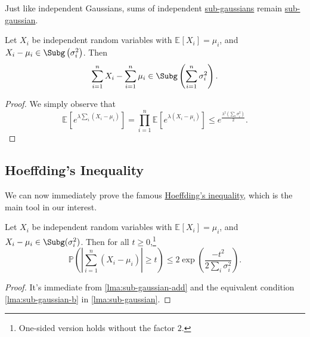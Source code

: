 Just like independent Gaussians, sums of independent \hyperref[def:sub-gaussian]{sub-gaussians} remain \hyperref[def:sub-gaussian]{sub-gaussian}.

\begin{lemma}\label{lma:sub-gaussian-add}
  Let \(X_i\) be independent random variables with \(\mathbb{E}_{}\left[X_i \right] = \mu _i\), and \(X_i - \mu _i \in \Subg\left( \sigma _i^2 \right)  \). Then
  \[
    \sum_{i=1}^n X_i - \sum_{i=1}^n \mu _i \in \Subg\left( \sum_{i=1}^n \sigma _i^2 \right) .
  \]
\end{lemma}
\begin{proof}
  We simply observe that
  \[
    \mathbb{E}_{}\left[e^{\lambda \sum_{i} (X_i - \mu _i)} \right]
    = \prod _{i=1}^n \mathbb{E}_{}\left[e^{\lambda (X_i - \mu _i)} \right]
    \leq e^{\frac{\lambda ^2 (\sum_{i} \sigma _i^2)}{2}}.
  \]
\end{proof}

\subsection{Hoeffding's Inequality}
We can now immediately prove the famous \hyperref[thm:Hoeffding-inequality]{Hoeffding's inequality}, which is the main tool in our interest.

\begin{theorem}\label{thm:Hoeffding-inequality}
  Let \(X_i\) be independent random variables with \(\mathbb{E}_{}\left[X_i \right] = \mu _i\), and \(X_i - \mu _i \in \Subg(\sigma _i^2) \). Then for all \(t \geq 0\),\footnote{One-sided version holds without the factor \(2\).}
  \[
    \mathbb{P} \left( \left\vert \sum_{i=1}^n (X_i - \mu _i) \right\vert \geq t \right) \leq 2 \exp (\frac{-t^2}{2 \sum_{i} \sigma _i^2}).
  \]
\end{theorem}
\begin{proof}
  It's immediate from \autoref{lma:sub-gaussian-add} and the equivalent condition \autoref{lma:sub-gaussian-b} in \autoref{lma:sub-gaussian}.
\end{proof}